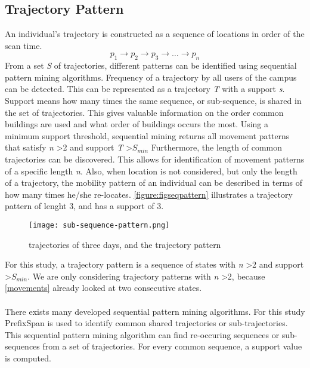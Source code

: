 \subsection{Trajectory Pattern}
An individual’s trajectory is constructed as a sequence of locations in order of the scan time. 
$$p_{1} \rightarrow p_{2} \rightarrow p_{3} \rightarrow …\rightarrow p_{n}$$
From a set \textit{S} of trajectories, different patterns can be identified using sequential pattern mining algorithms. Frequency of a trajectory by all users of the campus can be detected. This can be represented as a trajectory \textit{T} with a support \textit{s}. Support means how many times the same sequence, or sub-sequence, is shared in the set of trajectories. This gives valuable information on the order common buildings are used and what order of buildings occurs the most. Using a minimum support threshold, sequential mining returns all movement patterns that satisfy \textit{n} \textgreater 2 and support \textit{T} \textgreater \textit{$S_{min}$}   Furthermore, the length of common trajectories can be discovered. This allows for identification of movement patterns of a specific length \textit{n}. Also, when location is not considered, but only the length of a trajectory, the mobility pattern of an individual can be described in terms of how many times he/she re-locates. \autoref{figure:figseqpattern} illustrates a trajectory pattern of lenght 3, and has a support of 3.

\begin{figure}[H]
\centering
\texttt{[image: sub-sequence-pattern.png]}
\captionsetup{justification=centering}
\caption{trajectories of three days, and the trajectory pattern}
\label{figure:figseqpattern}
\end{figure}
For this study, a trajectory pattern is a sequence of states with \textit{n} \textgreater 2 and support \textgreater \textit{$S_{min}$}. We are only considering trajectory patterns with \textit{n} \textgreater 2, because \autoref{movements} already looked at two consecutive states.\\\\
There exists many developed sequential pattern mining algorithms. For this study PrefixSpan \cite{pei2004mining} is used to identify common shared trajectories or sub-trajectories. This sequential pattern mining algorithm can find re-occuring sequences or sub-sequences from a set of trajectories. For every common sequence, a support value is computed. 
